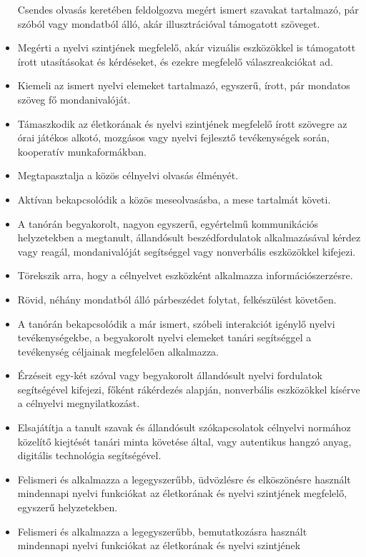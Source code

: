 \begin{itemize}
  Csendes olvasás keretében feldolgozva megért ismert szavakat
  tartalmazó, pár szóból vagy mondatból álló, akár illusztrációval
  támogatott szöveget.
\item
  Megérti a nyelvi szintjének megfelelő, akár vizuális eszközökkel is
  támogatott írott utasításokat és kérdéseket, és ezekre megfelelő
  válaszreakciókat ad.
\item
  Kiemeli az ismert nyelvi elemeket tartalmazó, egyszerű, írott, pár
  mondatos szöveg fő mondanivalóját.
\item
  Támaszkodik az életkorának és nyelvi szintjének megfelelő írott
  szövegre az órai játékos alkotó, mozgásos vagy nyelvi fejlesztő
  tevékenységek során, kooperatív munkaformákban.
\item
  Megtapasztalja a közös célnyelvi olvasás élményét.
\item
  Aktívan bekapcsolódik a közös meseolvasásba, a mese tartalmát követi.
\item
  A tanórán begyakorolt, nagyon egyszerű, egyértelmű kommunikációs
  helyzetekben a megtanult, állandósult beszédfordulatok alkalmazásával
  kérdez vagy reagál, mondanivalóját segítséggel vagy nonverbális
  eszközökkel kifejezi.
\item
  Törekszik arra, hogy a célnyelvet eszközként alkalmazza
  információszerzésre.
\item
  Rövid, néhány mondatból álló párbeszédet folytat, felkészülést
  követően.
\item
  A tanórán bekapcsolódik a már ismert, szóbeli interakciót igénylő
  nyelvi tevékenységekbe, a begyakorolt nyelvi elemeket tanári
  segítséggel a tevékenység céljainak megfelelően alkalmazza.
\item
  Érzéseit egy-két szóval vagy begyakorolt állandósult nyelvi fordulatok
  segítségével kifejezi, főként rákérdezés alapján, nonverbális
  eszközökkel kísérve a célnyelvi megnyilatkozást.
\item
  Elsajátítja a tanult szavak és állandósult szókapcsolatok célnyelvi
  normához közelítő kiejtését tanári minta követése által, vagy
  autentikus hangzó anyag, digitális technológia segítségével.
\item
  Felismeri és alkalmazza a legegyszerűbb, üdvözlésre és elköszönésre
  használt mindennapi nyelvi funkciókat az életkorának és nyelvi
  szintjének megfelelő, egyszerű helyzetekben.
\item
  Felismeri és alkalmazza a legegyszerűbb, bemutatkozásra használt
  mindennapi nyelvi funkciókat az életkorának és nyelvi szintjének

\end{itemize}
